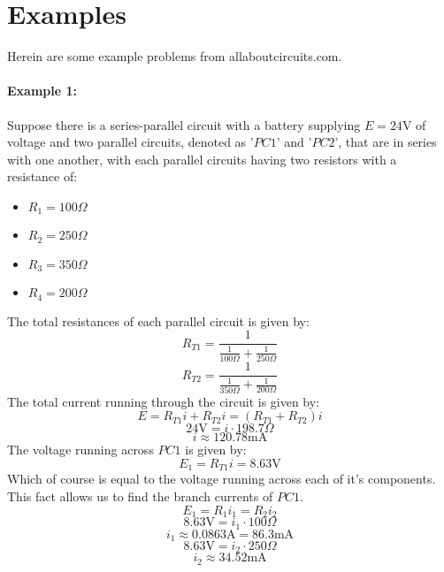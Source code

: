 \documentclass{article}
\begin{document}
	\section{Examples}
	Herein are some example problems from allaboutcircuits.com.
	\paragraph{Example 1:}Suppose there is a series-parallel circuit with a 
	battery supplying $E=24\text{V}$ of voltage and  two 
	parallel circuits, denoted as '$PC1$' and '$PC2$', that are in series with 
	one another, with each parallel circuits having two resistors with a 
	resistance of:
	\begin{itemize}
		\item $R_1 = 100 \Omega$
		\item $R_2 = 250 \Omega$
		\item $R_3 = 350 \Omega$
		\item $R_4 = 200 \Omega$
	\end{itemize}
	The total resistances of each parallel circuit is given by:
	\begin{equation}\label{eq:total-resistance-1}
		R_{T1} = \frac{1}{\frac{1}{100 \Omega} + \frac{1}{250 \Omega}}
	\end{equation}
	\begin{equation}\label{eq:total-resistance-2}
		R_{T2} = \frac{1}{\frac{1}{350 \Omega} + \frac{1}{200 \Omega}}
	\end{equation}
	The total current running through the circuit is given by:
	$$ E = R_{T1}i + R_{T2}i = (R_{T1} + R_{T2})i$$
	$$ 24\text{V} = i \cdot 198.7 \Omega$$
	\begin{equation}\label{eq:current-total}
		i \approx 120.78\text{mA}
	\end{equation}
	The voltage running across $PC1$ is given by:
	\begin{equation}\label{eq:voltage-1}
		E_1 = R_{T1}i = 8.63\text{V}
	\end{equation}
	Which of course is equal to the voltage running across each of it's 
	components.  This fact allows us to find the branch currents of $PC1$.
	$$ E_1 = R_1i_1 = R_2i_2$$
	$$ 8.63\text{V} = i_1 \cdot 100\Omega$$
	\begin{equation}\label{eq:current-1}
		i_1 \approx 0.0863\text{A} = 86.3\text{mA}
	\end{equation}
	$$ 8.63\text{V} = i_2 \cdot 250 \Omega$$
	\begin{equation}\label{eq:current-2}
		i_2 \approx 34.52 \text{mA}
	\end{equation}
\end{document}
